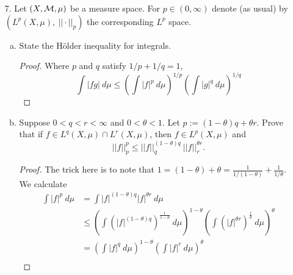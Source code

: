 \begin{itemize}
\begin{enumerate}[(a)]
\item Suppose $\phi : \bbr \rightarrow [0,\infty)$ is a non-negative measurable function, and that
$\Phi(x) := \int_{0}^{x}\phi(x) \ dm(t)$. Prove that
$$\int_{X} \Phi(f(x)) \ d\mu(x) = \int_{0}^{\infty} \phi(t) \mu(\{x \in X : t < f(x)\}) \ dm(t).$$
\begin{proof}
Substitute $\phi(t)$ with $\phi(t)\chi_{\{t < f(x)\}}$ WLOG. Then,
\begin{align*}
    \int_{X} \Phi(f(x)) \ d\mu &= \int_{X} \int_{0}^{\infty} \phi(t)\chi_{\{t < f(x)\}} \ dm \ d\mu \\
    &= \int_{0}^{\infty} \phi(t) 
    \int_{X} \chi_{\{t < f(x)\}} \ d\mu \ dm  \\
    &= \int_{0}^{\infty} \phi(t) \mu(\{t < f(x)\}) \ dm.
\end{align*}
\end{proof}
\end{enumerate}





\item[7.]Let $(X,\mathcal{M}, \mu)$ be a measure space. For $p \in (0,\infty)$ denote (as usual) by $(L^p(X,\mu), \ ||\cdot||_p)$ the corresponding $L^p$ space.
\begin{enumerate}[(a)]
\item State the H\"{o}lder inequality for integrals.
\begin{proof}
Where $p$ and $q$ satisfy $1/p + 1/q = 1$,
$$\int |fg| \ d\mu \leq \left( \int |f|^p \ d\mu \right)^{1/p} \left( \int |g|^q \ d\mu \right)^{1/q}$$
\end{proof}

\item Suppose $0 < q < r < \infty$ and $0 < \theta < 1$. Let $p := (1 - \theta)q + \theta r$. Prove that if
$f \in L^q(X,\mu) \cap L^r(X,\mu)$, then $f \in L^p(X,\mu)$ and
$$||f||_p^p \leq ||f||_q^{(1 - \theta)q} \ ||f||_r^{\theta r}.$$
\begin{proof}
The trick here is to note that $1 = (1-\theta) + \theta = \frac{1}{1/(1-\theta)} + \frac{1}{1/\theta}$. We calculate 
\begin{align*}
    \int |f|^p \ d\mu &= \int |f|^{(1 - \theta)q} |f|^{\theta r} \ d\mu \\
    &\leq \left( \int (|f|^{(1 - \theta)q})^{\frac{1}{1-\theta}} \ d\mu \right)^{1-\theta} \left( \int (|f|^{\theta r})^{\frac{1}{\theta}} \ d\mu \right)^{\theta} \\
    &= \left( \int |f|^{q} \ d\mu \right)^{1-\theta} \left( \int |f|^{r} \ d\mu \right)^{\theta} \\
\end{align*}
\end{proof}


\end{enumerate}
\end{itemize}
